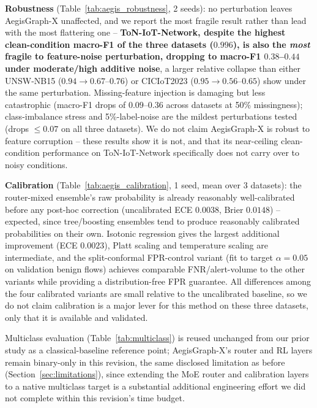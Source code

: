 \documentclass[journal]{IEEEtran}
\begin{document}
\textbf{Robustness} (Table~\ref{tab:aegis_robustness}, 2 seeds): no
perturbation leaves AegisGraph-X unaffected, and we report the most fragile
result rather than lead with the most flattering one -- \textbf{ToN-IoT-Network,
despite the highest clean-condition macro-F1 of the three datasets ($0.996$),
is also the \emph{most} fragile to feature-noise perturbation, dropping to
macro-F1 $0.38$--$0.44$ under moderate/high additive noise}, a larger
relative collapse than either UNSW-NB15 ($0.94\rightarrow0.67$--$0.76$) or
CICIoT2023 ($0.95\rightarrow0.56$--$0.65$) show under the same perturbation.
Missing-feature injection is damaging but less catastrophic (macro-F1 drops
of $0.09$--$0.36$ across datasets at 50\% missingness); class-imbalance
stress and 5\%-label-noise are the mildest perturbations tested (drops
$\le\!0.07$ on all three datasets). We do not claim AegisGraph-X is robust
to feature corruption -- these results show it is not, and that its
near-ceiling clean-condition performance on ToN-IoT-Network specifically
does not carry over to noisy conditions.

\textbf{Calibration} (Table~\ref{tab:aegis_calibration}, 1 seed, mean over 3
datasets): the router-mixed ensemble's raw probability is already
reasonably well-calibrated before any post-hoc correction (uncalibrated ECE
$0.0038$, Brier $0.0148$) -- expected, since tree/boosting ensembles tend to
produce reasonably calibrated probabilities on their own. Isotonic
regression gives the largest additional improvement (ECE $0.0023$), Platt
scaling and temperature scaling are intermediate, and the split-conformal
FPR-control variant (fit to target $\alpha{=}0.05$ on validation benign
flows) achieves comparable FNR/alert-volume to the other variants while
providing a distribution-free FPR guarantee. All differences among the four
calibrated variants are small relative to the uncalibrated baseline, so we
do not claim calibration is a major lever for this method on these three
datasets, only that it is available and validated.



Multiclass evaluation (Table~\ref{tab:multiclass}) is reused unchanged from
our prior study as a classical-baseline reference point; AegisGraph-X's
router and RL layers remain binary-only in this revision, the same
disclosed limitation as before (Section~\ref{sec:limitations}), since
extending the MoE router and calibration layers to a native multiclass
target is a substantial additional engineering effort we did not complete
within this revision's time budget.
\end{document}
